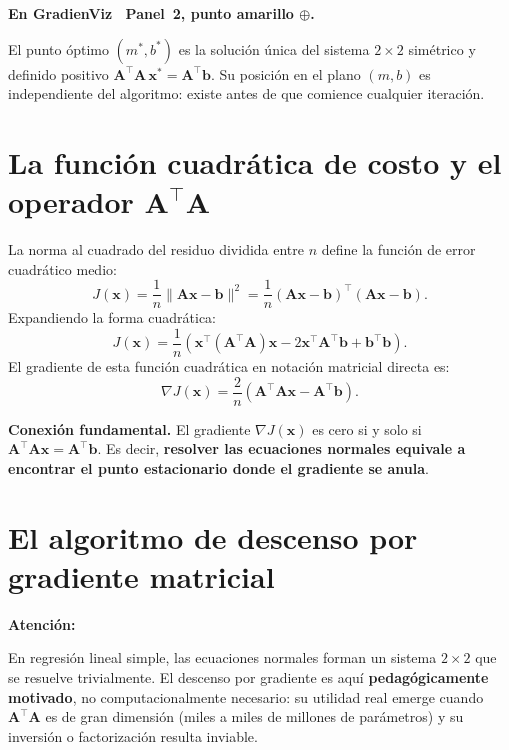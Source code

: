 ﻿\documentclass[12pt, a4paper]{article}
\newenvironment{viznota}[1]{%
    \begin{mdframed}[style=vizverde]
    \textbf{\color{bordeteo}En GradienViz \textemdash\ #1.}\quad
}{%
    \end{mdframed}
}
\newenvironment{vizadv}{%
    \begin{mdframed}[style=viznaranja]
    \textbf{\color{bordeadv}Atención:}\quad
}{%
    \end{mdframed}
}
\newenvironment{vizdef}{%
    \begin{mdframed}[style=vizazul]
}{%
    \end{mdframed}
}
\newcommand{\grad}{\nabla}
\newcommand{\mstar}{m^{*}}
\newcommand{\bstar}{b^{*}}
\newcommand{\T}{{\top}}
\begin{document}
\begin{viznota}{Panel~2, punto amarillo $\oplus$}
El punto óptimo $(\mstar, \bstar)$ es la solución única del sistema $2\times 2$ simétrico y definido positivo $\mathbf{A}^\T \mathbf{A}\,\mathbf{x}^* = \mathbf{A}^\T \mathbf{b}$. Su posición en el plano $(m, b)$ es independiente del algoritmo: existe antes de que comience cualquier iteración.
\end{viznota}

\section{La función cuadrática de costo y el operador $\mathbf{A}^\T \mathbf{A}$}

La norma al cuadrado del residuo dividida entre $n$ define la función de error cuadrático medio:
\[
    J(\mathbf{x}) = \frac{1}{n} \|\mathbf{A}\mathbf{x} - \mathbf{b}\|^2
    = \frac{1}{n} (\mathbf{A}\mathbf{x} - \mathbf{b})^\T (\mathbf{A}\mathbf{x} - \mathbf{b}).
\]
Expandiendo la forma cuadrática:
\[
    J(\mathbf{x}) = \frac{1}{n} \left(
        \mathbf{x}^\T (\mathbf{A}^\T \mathbf{A}) \mathbf{x}
        - 2 \mathbf{x}^\T \mathbf{A}^\T \mathbf{b}
        + \mathbf{b}^\T \mathbf{b}
    \right).
\]
El gradiente de esta función cuadrática en notación matricial directa es:
\begin{equation}\label{eq:grad_matriz}
    \grad J(\mathbf{x}) = \frac{2}{n} \left(
        \mathbf{A}^\T \mathbf{A} \mathbf{x} - \mathbf{A}^\T \mathbf{b}
    \right).
\end{equation}

\begin{vizdef}
\textbf{Conexión fundamental.} El gradiente $\grad J(\mathbf{x})$ es cero si y solo si $\mathbf{A}^\T \mathbf{A} \mathbf{x} = \mathbf{A}^\T \mathbf{b}$. Es decir, \textbf{resolver las ecuaciones normales equivale a encontrar el punto estacionario donde el gradiente se anula}.
\end{vizdef}

\section{El algoritmo de descenso por gradiente matricial}

\begin{vizadv}
En regresión lineal simple, las ecuaciones normales forman un sistema $2\times 2$ que se resuelve trivialmente. El descenso por gradiente es aquí \textbf{pedagógicamente motivado}, no computacionalmente necesario: su utilidad real emerge cuando $\mathbf{A}^\T\mathbf{A}$ es de gran dimensión (miles a miles de millones de parámetros) y su inversión o factorización resulta inviable.
\end{vizadv}
\end{document}
